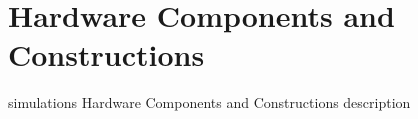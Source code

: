 \section{Hardware Components and Constructions}

simulations Hardware Components and Constructions description

